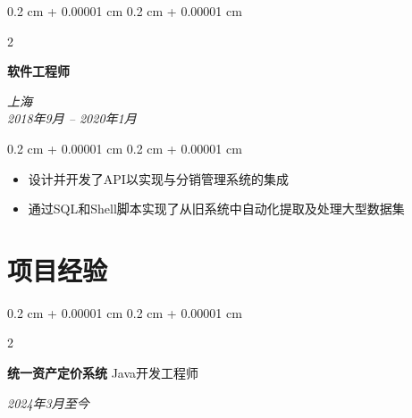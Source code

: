 \documentclass[10pt, letterpaper]{article}
\newenvironment{highlights}{
	\begin{itemize}[
		topsep=0.10 cm,
		parsep=0.10 cm,
		partopsep=0pt,
		itemsep=0pt,
		leftmargin=0.4 cm + 10pt
		]
	}{
	\end{itemize}
} %
\newenvironment{onecolentry}{
	\begin{adjustwidth}{
			0.2 cm + 0.00001 cm
		}{
			0.2 cm + 0.00001 cm
		}
	}{
	\end{adjustwidth}
} %
\newenvironment{twocolentry}[2][]{
	\onecolentry
	\def\secondColumn{#2}
	\setcolumnwidth{\fill, 4.5 cm}
	\begin{paracol}{2}
	}{
		\switchcolumn \raggedleft \secondColumn
	\end{paracol}
	\endonecolentry
} %
\begin{document}
	
	\vspace{0.2 cm}

	\vspace{0.2 cm}	
	
	\begin{twocolentry}{
		\textit{上海}\\
		\textit{2018年9月 – 2020年1月}}
		\textbf{软件工程师}
		\\
	\end{twocolentry}
	
	\vspace{0.08 cm}
	\begin{onecolentry}
		\begin{highlights}
			\item{设计并开发了API以实现与分销管理系统的集成}
			\item{通过SQL和Shell脚本实现了从旧系统中自动化提取及处理大型数据集}
		\end{highlights}
	\end{onecolentry}
	
	
	\section{项目经验}
	\vspace{0.1 cm}
	
	
	\begin{twocolentry}{
			\textit{2024年3月至今}}
			\textbf{统一资产定价系统} 
			\space\space\space\space\space\space\space\space\space\space\space\space Java开发工程师
		\end{twocolentry}
		
\end{document}
